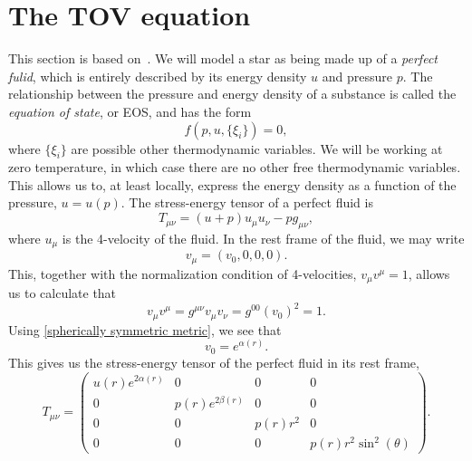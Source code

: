 \section{The TOV equation}
\label{section: TOV equation}

This section is based on~\autocite{carrollSpacetimeGeometryIntroduction2019,glendenningCompactStarsNuclear2012}.
We will model a star as being made up of a \emph{perfect fulid}, which is entirely described by its energy density $u$ and pressure $p$.
The relationship between the pressure and energy density of a substance is called the \emph{equation of state}, or EOS, and has the form
\begin{equation}
    \label{EOS}
    f(p, u, \{\xi_i\}) = 0,
\end{equation}
where $\{\xi_i\}$ are possible other thermodynamic variables.
We will be working at zero temperature, in which case there are no other free thermodynamic variables.
This allows us to, at least locally, express the energy density as a function of the pressure, $u = u(p)$.
The stress-energy tensor of a perfect fluid is
%
\begin{equation}
    T_{\mu \nu} = (u + p) u_\mu u_\nu - p g_{\mu \nu},
\end{equation} 
where $u_\mu$ is the 4-velocity of the fluid.
In the rest frame of the fluid, we may write 
\begin{equation}
    v_\mu = \left(v_0, 0, 0, 0\right).
\end{equation}
This, together with the normalization condition of 4-velocities, $v_\mu v^\mu = 1$, allows us to calculate that
%
\begin{equation}
    v_\mu v^\mu = g^{\mu \nu} v_\mu v_\nu = g^{00} (v_0)^2 = 1.
\end{equation}
%
Using \autoref{spherically symmetric metric}, we see that
\begin{equation}
    v_0 = e^{\alpha(r)}.
\end{equation}
%
This gives us the stress-energy tensor of the perfect fluid in its rest frame,
%
\begin{equation}
    T_{\mu \nu} 
    =
    \left(
        \begin{matrix}
            u{\left(r \right)} e^{2 \alpha{\left(r \right)}} & 0 & 0 & 0\\0 & 
            p{\left(r \right)} e^{2 \beta{\left(r \right)}} & 0 & 0\\
            0 & 0 & p{\left(r \right)} r^{2} & 0\\
            0 & 0 & 0 & p{\left(r \right)} r^{2} \sin^{2}{\left(\theta \right)}
        \end{matrix}
    \right).
\end{equation}
